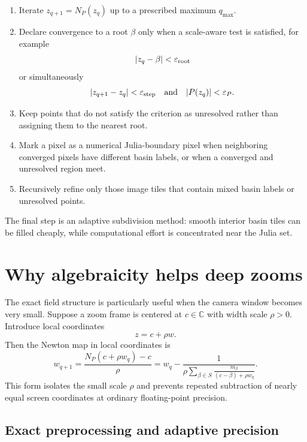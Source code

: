 \documentclass[11pt,a4paper]{article}
\theoremstyle{definition}
\newcommand{\C}{\mathbb{C}}
\begin{document}
\begin{enumerate}[label=\textbf{Step \arabic*.},leftmargin=18mm]
\item Iterate $z_{q+1}=N_P(z_q)$ up to a prescribed maximum $q_{\max}$.
\item Declare convergence to a root $\beta$ only when a scale-aware test is satisfied, for example
\[
|z_q-\beta|<\varepsilon_{\rm root}
\]
or simultaneously
\[
|z_{q+1}-z_q|<\varepsilon_{\rm step}
\quad\text{and}\quad
|P(z_q)|<\varepsilon_P.
\]
\item Keep points that do not satisfy the criterion as unresolved rather than assigning them to the nearest root.
\item Mark a pixel as a numerical Julia-boundary pixel when neighboring converged pixels have different basin labels, or when a converged and unresolved region meet.
\item Recursively refine only those image tiles that contain mixed basin labels or unresolved points.
\end{enumerate}

The final step is an adaptive subdivision method: smooth interior basin tiles can be filled cheaply, while computational effort is concentrated near the Julia set.

\section{Why algebraicity helps deep zooms}

The exact field structure is particularly useful when the camera window becomes very small.  Suppose a zoom frame is centered at $c\in\C$ with width scale $\rho>0$.  Introduce local coordinates
\begin{equation}
\label{eq:localcoord}
z=c+\rho w.
\end{equation}
Then the Newton map in local coordinates is
\begin{equation}
\label{eq:localnewton}
w_{q+1}
=\frac{N_P(c+\rho w_q)-c}{\rho}
=w_q-
\frac{1}{\rho\displaystyle\sum_{\beta\in S}
\frac{m_\beta}{(c-\beta)+\rho w_q}}.
\end{equation}
This form isolates the small scale $\rho$ and prevents repeated subtraction of nearly equal screen coordinates at ordinary floating-point precision.

\subsection{Exact preprocessing and adaptive precision}
\end{document}
